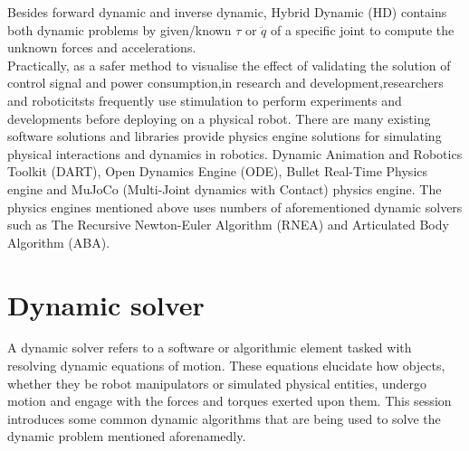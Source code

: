\documentclass[report.tex]{subfiles}
\begin{document}
    Besides forward dynamic and inverse dynamic, Hybrid Dynamic (HD) contains both dynamic problems by given/known $\tau$ or $\ddot{q}$ of a specific joint to compute the unknown forces and accelerations.\\
    Practically, as a safer method to visualise the effect of validating the solution of control signal and power consumption,in research and development,researchers and roboticitsts frequently use stimulation to perform experiments and developments before deploying on a physical robot. There are many existing software solutions and libraries provide physics engine solutions for simulating physical interactions and dynamics in robotics. Dynamic Animation and Robotics Toolkit (DART)\cite{Lee2018}, Open Dynamics Engine (ODE)\cite{ODE}, Bullet Real-Time Physics engine\cite{Admin_2022} and MuJoCo (Multi-Joint dynamics with Contact) physics engine\cite{MuJoCo}. The physics engines mentioned above uses numbers of aforementioned dynamic solvers such as The Recursive Newton-Euler Algorithm (RNEA) and Articulated Body Algorithm (ABA).

    \section{Dynamic solver}
    A dynamic solver refers to a software or algorithmic element tasked with resolving dynamic equations of motion. These equations elucidate how objects, whether they be robot manipulators or simulated physical entities, undergo motion and engage with the forces and torques exerted upon them. This session introduces some common dynamic algorithms that are being used to solve the dynamic problem mentioned aforenamedly.
    \raggedbottom
\end{document}
